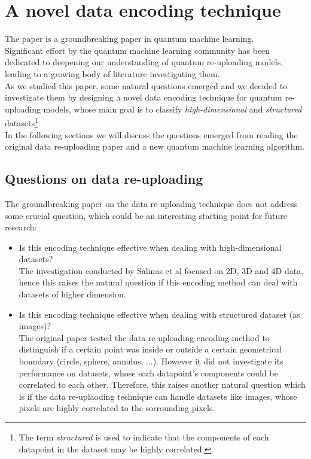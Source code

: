 
\chapter{A novel data encoding technique}

The paper \cite{P_rez_Salinas_2020} is a groundbreaking paper in quantum machine learning.\\
Significant effort by the quantum machine learning community has been dedicated to deepening our understanding of 
quantum re-uploading models, leading to a growing body of literature investigating them.\\
As we studied this paper, some natural questions emerged and we decided to investigate them by designing
a novel data encoding technique for quantum re-uploading models, whose main goal is to classify 
\textit{high-dimensional} and \textit{structured} datasets\footnote[1]{The term \textit{structured} is 
used to indicate that the components of each datapoint in the dataset may be highly correlated.}.\\
In the following sections we will discuss the questions emerged from reading the original data re-uploading
paper and a new quantum machine learning algorithm.

\section{Questions on data re-uploading}

The groundbreaking paper on the data re-uploading technique \cite{P_rez_Salinas_2020} does not address some crucial 
question, which could be an interesting starting point for future research:

\begin{itemize}
    \item\label{question:first} Is this encoding technique effective when dealing with high-dimensional datasets?\\
    The investigation conducted by Salinas et al focused on 2D, 3D and 4D data, hence this raises the natural
    question if this encoding method can deal with datasets of higher dimension.
    \item\label{question:second} Is this encoding technique effective when dealing with structured dataset (as images)?\\
    The original paper tested the data re-uploading encoding method to distinguish if a certain point was 
    inside or outside a certain geometrical boundary (circle, sphere, annulus, ...).
    However it did not investigate its performance on datasets, whose each datapoint's components could 
    be correlated to each other.
    Therefore, this raises another natural question which is if the data re-uplaoding technique can handle datasets
    like images, whose pixels are highly correlated to the sorrounding pixels.
\end{itemize}

